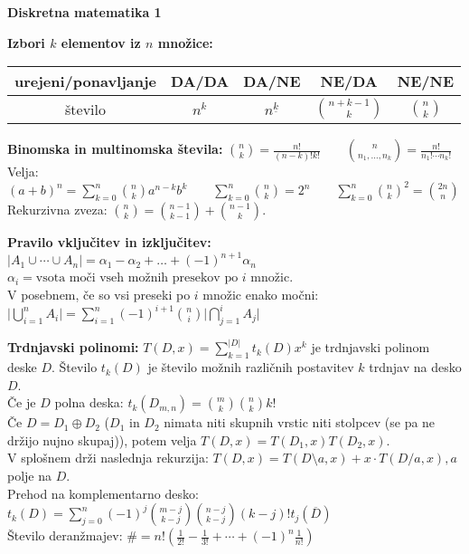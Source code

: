 \documentclass[a4paper, oneside, 10pt]{article}
\title{\mytitle}
\author{Jure Slak}
\date{\today}
\theoremstyle{definition}
\begin{document}
\pagestyle{empty}

\begin{center}
  \bf \Large Diskretna matematika 1
\end{center}

\textbf{Izbori $k$ elementov iz $n$ množice:} \\[6pt]
\begin{tabular}[h]{|c|c|c|c|c|} 
  \hline
  urejeni/ponavljanje & DA/DA & DA/NE & NE/DA & NE/NE \\ \hline
  število & $n^k$ & $n^{\underline{k}}$ & $\binom{n+k-1}{k}$ & $\binom{n}{k}$ \\ \hline
\end{tabular}

\textbf{Binomska in multinomska števila:} $\binom{n}{k} = \frac{n!}{(n-k)!k!} \qquad \binom{n}{n_1, \ldots, n_k} =
\frac{n!}{n_1!\cdots n_k!}$ \\
Velja: $(a+b)^n = \sum_{k=0}^n\binom{n}{k}a^{n-k}b^k \qquad \sum_{k=0}^n\binom{n}{k} =
2^n \qquad \sum_{k=0}^n\binom{n}{k}^2 = \binom{2n}{n}$ \\
Rekurzivna zveza: $\binom{n}{k} = \binom{n-1}{k-1} + \binom{n-1}{k}$.

\textbf{Pravilo vključitev in izključitev:} $|A_1 \cup \cdots \cup A_n| = \alpha_1 - \alpha_2 + \dots +
(-1)^{n+1}\alpha_n$ \\
$\alpha_i = \text{vsota moči vseh možnih presekov po $i$ množic}$. \\
V posebnem, če so vsi preseki po $i$ množic enako močni: 
$\lvert\bigcup_{i=1}^nA_i\rvert = \sum_{i=1}^n (-1)^{i+1}\binom{n}{i}\lvert\bigcap_{j=1}^iA_j\rvert$

\textbf{Trdnjavski polinomi:}
$T(D, x) = \sum_{k=1}^{|D|}t_k(D)x^k$ je trdnjavski polinom deske $D$. Število $t_k(D)$ je
število možnih različnih postavitev $k$ trdnjav na desko $D$.\\
Če je $D$ polna deska: $t_k(D_{m, n}) = \binom{m}{k}\binom{n}{k}k!$ \\
Če $D=D_1\oplus D_2$ ($D_1$ in $D_2$ nimata niti skupnih vrstic niti stolpcev (se pa ne
držijo nujno skupaj)), potem velja $T(D, x) = T(D_1, x)T(D_2, x)$. \\
V splošnem drži naslednja rekurzija: $T(D, x) = T(D\!\setminus\! a, x) + x\cdot T(D/a, x), a$
polje na $D$. \\
Prehod na komplementarno desko: $t_k(D) =
\sum_{j=0}^n(-1)^j\binom{m-j}{k-j}\binom{n-j}{k-j}(k-j)!t_j(\overline{D})$ \\
Število deranžmajev: $\# = n!(\frac{1}{2!} - \frac{1}{3!} + \cdots + (-1)^n\frac{1}{n!})$
\end{document}
